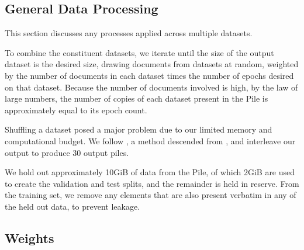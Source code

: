 \documentclass[11pt,a4paper]{article}
\begin{document}
\begin{appendices}
\section{General Data Processing}
This section discusses any processes applied across multiple datasets.

To combine the constituent datasets, we iterate until the size of the output dataset is the desired size, drawing documents from datasets at random, weighted by the number of documents in each dataset times the number of epochs desired on that dataset. Because the number of documents involved is high, by the law of large numbers, the number of copies of each dataset present in the Pile is approximately equal to its epoch count.

Shuffling a dataset posed a major problem due to our limited memory and computational budget. We follow \citet{hardin_2018}, a method descended from \citet{10.2307/25049166}, and interleave our output to produce 30 output piles. 

We hold out approximately 10GiB of data from the Pile, of which 2GiB are used to create the validation and test splits, and the remainder is held in reserve. From the training set, we remove any elements that are also present verbatim in any of the held out data, to prevent leakage.

\subsection{Weights}\label{apdx:methods}

\end{appendices}
\end{document}
